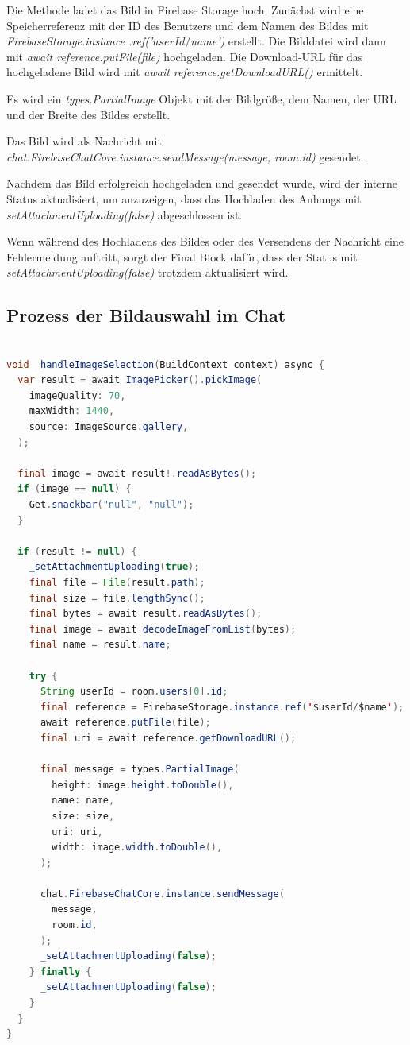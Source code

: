 Die Methode ladet das Bild in Firebase Storage hoch.
Zunächst wird eine Speicherreferenz mit der ID des Benutzers und dem Namen des Bildes mit \textit{FirebaseStorage.instance .ref('$userId/$name')} erstellt.
Die Bilddatei wird dann mit \textit{await reference.putFile(file)} hochgeladen.
Die Download-URL für das hochgeladene Bild wird mit \textit{await reference.getDownloadURL()} ermittelt.

Es wird ein \textit{types.PartialImage} Objekt mit der Bildgröße, dem Namen, der URL und der Breite des Bildes erstellt.

Das Bild wird als Nachricht mit \textit{chat.FirebaseChatCore.instance.sendMessage(message, room.id)} gesendet.

Nachdem das Bild erfolgreich hochgeladen und gesendet wurde, wird der interne Status aktualisiert, um anzuzeigen, dass das Hochladen des Anhangs mit \textit{setAttachmentUploading(false)} abgeschlossen ist.

Wenn während des Hochladens des Bildes oder des Versendens der Nachricht eine Fehlermeldung auftritt, sorgt der Final Block dafür, dass der Status mit \textit{setAttachmentUploading(false)} trotzdem aktualisiert wird.


\subsection{Prozess der Bildauswahl im Chat}

\begin{lstlisting}[language=Java,caption=Prozess der Bildauswahl und -verarbeitung,label=lst:fotoSelektion]  

void _handleImageSelection(BuildContext context) async {
  var result = await ImagePicker().pickImage(
    imageQuality: 70,
    maxWidth: 1440,
    source: ImageSource.gallery,
  );

  final image = await result!.readAsBytes();
  if (image == null) {
    Get.snackbar("null", "null");
  }

  if (result != null) {
    _setAttachmentUploading(true);
    final file = File(result.path);
    final size = file.lengthSync();
    final bytes = await result.readAsBytes();
    final image = await decodeImageFromList(bytes);
    final name = result.name;

    try {
      String userId = room.users[0].id;
      final reference = FirebaseStorage.instance.ref('$userId/$name');
      await reference.putFile(file);
      final uri = await reference.getDownloadURL();

      final message = types.PartialImage(
        height: image.height.toDouble(),
        name: name,
        size: size,
        uri: uri,
        width: image.width.toDouble(),
      );

      chat.FirebaseChatCore.instance.sendMessage(
        message,
        room.id,
      );
      _setAttachmentUploading(false);
    } finally {
      _setAttachmentUploading(false);
    }
  }
}

\end{lstlisting}

